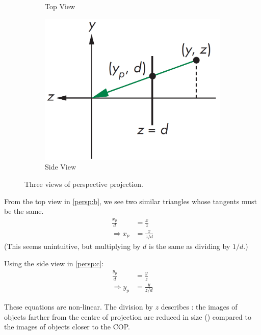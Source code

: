 \documentclass[../COS3712_Notes.tex]{subfiles}
\begin{document}
\begin{figure}[b]
\begin{center}
\begin{subfigure}{0.3\textwidth}
            \caption{Top View}
            \label{persp:b}
          \end{subfigure}
          \begin{subfigure}{0.3\textwidth}
            \includegraphics[width=\textwidth]{images/chapter05/perspective_side.png}
            \caption{Side View}
            \label{persp:c}
          \end{subfigure}
        \end{center}
        \caption{Three views of perspective projection.}
      \end{figure}

      From the top view in \autoref{persp:b}, we see two similar triangles
      whose tangents must be the same.
      \begin{align*}
        \frac{x_p}{d} &= \frac{x}{z}\\
        \Rightarrow x_p &= \frac{x}{z/d}
      \end{align*}
      (This seems unintuitive, but multiplying by $d$ is the same as dividing by $1/d$.)

      Using the side view in \autoref{persp:c}:
      \begin{align*}
        \frac{y_p}{d} &= \frac{y}{z}\\
        \Rightarrow y_p &= \frac{y}{z/d}
      \end{align*}

      These equations are non-linear.
      The division by $z$ describes :
      the images of objects farther from the centre of projection are reduced in size
      () compared to the images of objects closer to the COP.
\end{document}
